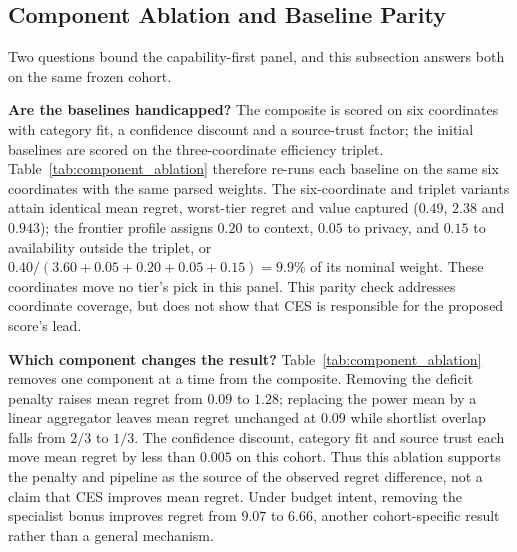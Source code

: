 \documentclass[pdflatex,sn-mathphys-num]{sn-jnl}
\theoremstyle{thmstyleone}
\theoremstyle{thmstylethree}
\begin{document}
\subsection{Component Ablation and Baseline Parity}\label{subsec:parity}

Two questions bound the capability-first panel, and this subsection answers both on the same frozen cohort.

\textbf{Are the baselines handicapped?} The composite is scored on six coordinates with category fit, a confidence discount and a source-trust factor; the initial baselines are scored on the three-coordinate efficiency triplet. Table~\ref{tab:component_ablation} therefore re-runs each baseline on the same six coordinates with the same parsed weights. The six-coordinate and triplet variants attain identical mean regret, worst-tier regret and value captured ($0.49$, $2.38$ and $0.943$); the frontier profile assigns $0.20$ to context, $0.05$ to privacy, and $0.15$ to availability outside the triplet, or $0.40/(3.60+0.05+0.20+0.05+0.15)=9.9\%$ of its nominal weight. These coordinates move no tier's pick in this panel. This parity check addresses coordinate coverage, but does not show that CES is responsible for the proposed score's lead.

\textbf{Which component changes the result?} Table~\ref{tab:component_ablation} removes one component at a time from the composite. Removing the deficit penalty raises mean regret from $0.09$ to $1.28$; replacing the power mean by a linear aggregator leaves mean regret unchanged at $0.09$ while shortlist overlap falls from $2/3$ to $1/3$. The confidence discount, category fit and source trust each move mean regret by less than $0.005$ on this cohort. Thus this ablation supports the penalty and pipeline as the source of the observed regret difference, not a claim that CES improves mean regret. Under budget intent, removing the specialist bonus improves regret from $9.07$ to $6.66$, another cohort-specific result rather than a general mechanism.
\end{document}

